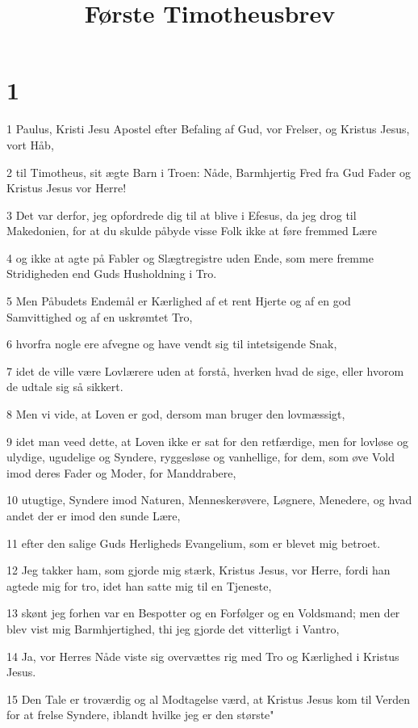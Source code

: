 

\title{Første Timotheusbrev}


\chapter{1}

\par 1 Paulus, Kristi Jesu Apostel efter Befaling af Gud, vor Frelser, og Kristus Jesus, vort Håb,
\par 2 til Timotheus, sit ægte Barn i Troen: Nåde, Barmhjertig Fred fra Gud Fader og Kristus Jesus vor Herre!
\par 3 Det var derfor, jeg opfordrede dig til at blive i Efesus, da jeg drog til Makedonien, for at du skulde påbyde visse Folk ikke at føre fremmed Lære
\par 4 og ikke at agte på Fabler og Slægtregistre uden Ende, som mere fremme Stridigheden end Guds Husholdning i Tro.
\par 5 Men Påbudets Endemål er Kærlighed af et rent Hjerte og af en god Samvittighed og af en uskrømtet Tro,
\par 6 hvorfra nogle ere afvegne og have vendt sig til intetsigende Snak,
\par 7 idet de ville være Lovlærere uden at forstå, hverken hvad de sige, eller hvorom de udtale sig så sikkert.
\par 8 Men vi vide, at Loven er god, dersom man bruger den lovmæssigt,
\par 9 idet man veed dette, at Loven ikke er sat for den retfærdige, men for lovløse og ulydige, ugudelige og Syndere, ryggesløse og vanhellige, for dem, som øve Vold imod deres Fader og Moder, for Manddrabere,
\par 10 utugtige, Syndere imod Naturen, Menneskerøvere, Løgnere, Menedere, og hvad andet der er imod den sunde Lære,
\par 11 efter den salige Guds Herligheds Evangelium, som er blevet mig betroet.
\par 12 Jeg takker ham, som gjorde mig stærk, Kristus Jesus, vor Herre, fordi han agtede mig for tro, idet han satte mig til en Tjeneste,
\par 13 skønt jeg forhen var en Bespotter og en Forfølger og en Voldsmand; men der blev vist mig Barmhjertighed, thi jeg gjorde det vitterligt i Vantro,
\par 14 Ja, vor Herres Nåde viste sig overvættes rig med Tro og Kærlighed i Kristus Jesus.
\par 15 Den Tale er troværdig og al Modtagelse værd, at Kristus Jesus kom til Verden for at frelse Syndere, iblandt hvilke jeg er den største"
